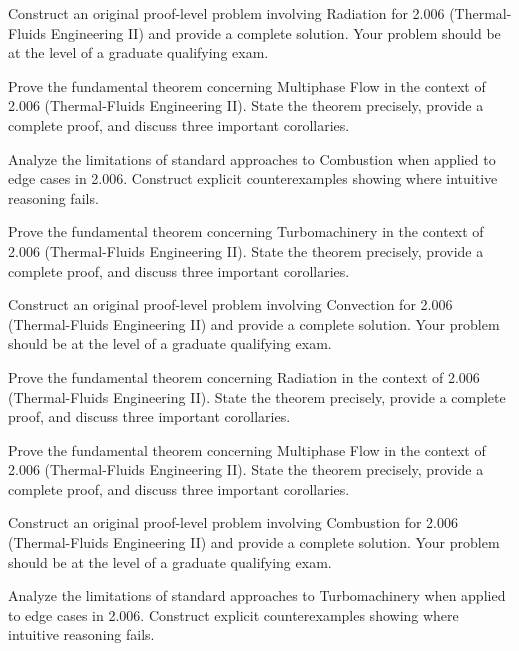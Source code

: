 \documentclass[12pt,a4paper]{exam}
\begin{document}
\begin{questions}
\vspace{0.3cm}

\question[3]
Construct an original proof-level problem involving Radiation for 2.006 (Thermal-Fluids Engineering II) and provide a complete solution. Your problem should be at the level of a graduate qualifying exam.

\vspace{0.3cm}

\question[2]
Prove the fundamental theorem concerning Multiphase Flow in the context of 2.006 (Thermal-Fluids Engineering II). State the theorem precisely, provide a complete proof, and discuss three important corollaries.

\vspace{0.3cm}

\question[3]
Analyze the limitations of standard approaches to Combustion when applied to edge cases in 2.006. Construct explicit counterexamples showing where intuitive reasoning fails.

\vspace{0.3cm}

\question[6]
Prove the fundamental theorem concerning Turbomachinery in the context of 2.006 (Thermal-Fluids Engineering II). State the theorem precisely, provide a complete proof, and discuss three important corollaries.

\vspace{0.3cm}

\question[5]
Construct an original proof-level problem involving Convection for 2.006 (Thermal-Fluids Engineering II) and provide a complete solution. Your problem should be at the level of a graduate qualifying exam.

\vspace{0.3cm}

\question[5]
Prove the fundamental theorem concerning Radiation in the context of 2.006 (Thermal-Fluids Engineering II). State the theorem precisely, provide a complete proof, and discuss three important corollaries.

\vspace{0.3cm}

\question[2]
Prove the fundamental theorem concerning Multiphase Flow in the context of 2.006 (Thermal-Fluids Engineering II). State the theorem precisely, provide a complete proof, and discuss three important corollaries.

\vspace{0.3cm}

\question[5]
Construct an original proof-level problem involving Combustion for 2.006 (Thermal-Fluids Engineering II) and provide a complete solution. Your problem should be at the level of a graduate qualifying exam.

\vspace{0.3cm}

\question[3]
Analyze the limitations of standard approaches to Turbomachinery when applied to edge cases in 2.006. Construct explicit counterexamples showing where intuitive reasoning fails.

\vspace{0.3cm}

\end{questions}
\end{document}

